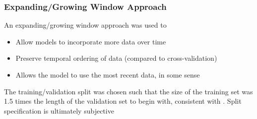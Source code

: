 \documentclass[]{beamer}
\begin{document}

\begin{frame}
\frametitle{Expanding/Growing Window Approach}
An expanding/growing window approach was used to
\begin{itemize}
	\item Allow models to incorporate more data over time
	\item Preserve temporal ordering of data (compared to cross-validation)
	\item Allows the model to use the most recent data, in some sense
\end{itemize}
The training/validation split was chosen such that the size of the training set was 1.5 times the length of the validation set to begin with, consistent with \cite{gu_empirical_2018}.
Split specification is ultimately subjective
\end{frame}
\end{document}
